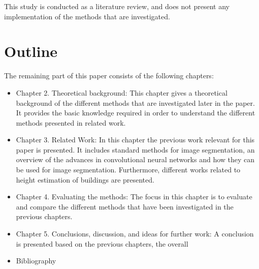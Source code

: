 This study is conducted as a literature review, and does not present any implementation of the methods that are investigated.

\section{Outline}
The remaining part of this paper consists of the following chapters:

\begin{itemize}
\item Chapter 2. Theoretical background: This chapter gives a theoretical background of the different methods that are investigated later in the paper. It provides the basic knowledge required in order to understand the different methods presented in related work.
\item Chapter 3. Related Work: In this chapter the previous work relevant for this paper is presented. It includes standard methods for image segmentation, an overview of the advances in convolutional neural networks and how they can be used for image segmentation. Furthermore, different works related to height estimation of buildings are presented.
\item Chapter 4. Evaluating the methods: The focus in this chapter is to evaluate and compare the different methods that have been investigated in the previous chapters.
\item Chapter 5. Conclusions, discussion, and ideas for further work: A conclusion is presented based on the previous chapters, the overall 
\item Bibliography
\end{itemize}
